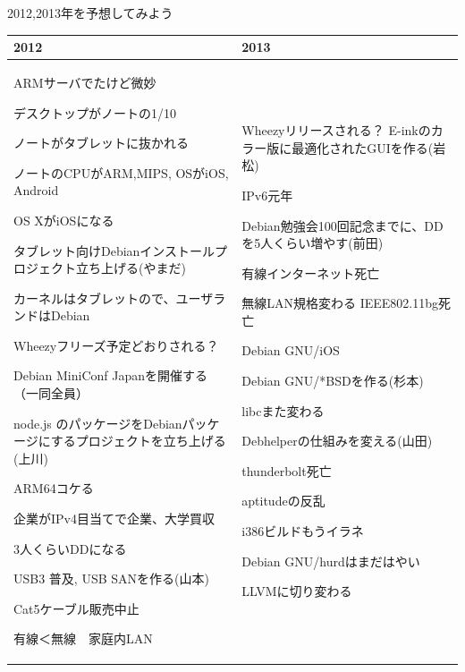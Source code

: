 \begin{frame}{2012,2013年を予想してみよう}

{\tiny
\begin{tabular}[t]{|p{20em}|p{20em}|}
\hline
2012 & 2013 \\
\hline


ARMサーバでたけど微妙

デスクトップがノートの1/10

ノートがタブレットに抜かれる

ノートのCPUがARM,MIPS, OSがiOS, Android

OS XがiOSになる

タブレット向けDebianインストールプロジェクト立ち上げる(やまだ)

カーネルはタブレットので、ユーザランドはDebian

Wheezyフリーズ予定どおりされる？

Debian MiniConf Japanを開催する（一同全員）

node.js のパッケージをDebianパッケージにするプロジェクトを立ち上げる(上川)

ARM64コケる

企業がIPv4目当てで企業、大学買収

3人くらいDDになる

USB3 普及, USB SANを作る(山本)

Cat5ケーブル販売中止

有線＜無線　家庭内LAN

&

Wheezyリリースされる？
E-inkのカラー版に最適化されたGUIを作る(岩松)

IPv6元年

Debian勉強会100回記念までに、DDを5人くらい増やす(前田)

有線インターネット死亡

無線LAN規格変わる IEEE802.11bg死亡

Debian GNU/iOS

Debian GNU/*BSDを作る(杉本)

libcまた変わる

Debhelperの仕組みを変える(山田)

thunderbolt死亡

aptitudeの反乱

i386ビルドもうイラネ

Debian GNU/hurdはまだはやい

LLVMに切り変わる
\\
\hline
\end{tabular}
}
\end{frame}

